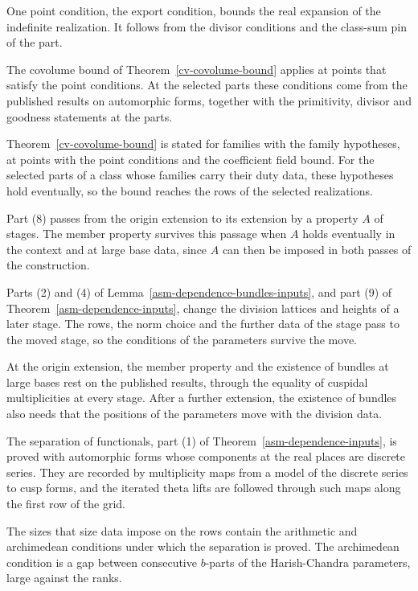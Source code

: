 One point condition, the export condition, bounds the real expansion of the
indefinite realization. It follows from the divisor conditions and the class-sum
pin of the part.

The covolume bound of Theorem~\ref{cv-covolume-bound} applies at points that
satisfy the point conditions. At the selected parts these conditions come from
the published results on automorphic forms, together with the primitivity,
divisor and goodness statements at the parts.

Theorem~\ref{cv-covolume-bound} is stated for families with the family
hypotheses, at points with the point conditions and the coefficient field bound.
For the selected parts of a class whose families carry their duty data, these
hypotheses hold eventually, so the bound reaches the rows of the selected
realizations.

Part (8) passes from the origin extension to its extension by a property $A$ of
stages. The member property survives this passage when $A$ holds eventually in
the context and at large base data, since $A$ can then be imposed in both passes
of the construction.

Parts (2) and (4) of Lemma~\ref{asm-dependence-bundles-inputs}, and part (9) of
Theorem~\ref{asm-dependence-inputs}, change the division lattices and heights of
a later stage. The rows, the norm choice and the further data of the stage pass
to the moved stage, so the conditions of the parameters survive the move.

At the origin extension, the member property and the existence of bundles at
large bases rest on the published results, through the equality of cuspidal
multiplicities at every stage. After a further extension, the existence of
bundles also needs that the positions of the parameters move with the division
data.

The separation of functionals, part (1) of Theorem~\ref{asm-dependence-inputs},
is proved with automorphic forms whose components at the real places are
discrete series. They are recorded by multiplicity maps from a model of the
discrete series to cusp forms, and the iterated theta lifts are followed
through such maps along the first row of the grid.

The sizes that size data impose on the rows contain the arithmetic and
archimedean conditions under which the separation is proved. The archimedean
condition is a gap between consecutive $b$-parts of the Harish-Chandra
parameters, large against the ranks.

